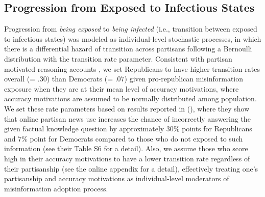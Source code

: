\documentclass[man, 12pt, a4paper, nolmodern, noextraspace]{apa6}
\begin{document}
\subsection{Progression from Exposed to Infectious States}
    Progression from \emph{being exposed} to \emph{being infected} (i.e., transition between exposed to infectious states) was modeled as individual-level stochastic processes, in which there is a differential hazard of transition across partisans following a Bernoulli distribution with the transition rate parameter. Consistent with partisan motivated reasoning accounts \parencite{taber2006, nyhan2010corrections}, we set Republicans to have higher transition rates overall (= .30) than Democrats (= .07) given pro-republican misinformation exposure when they are at their mean level of accuracy motivations, where accuracy motivations are assumed to be normally distributed among population. We set these rate parameters based on results reported in \citeauthor{garrett2016driving} (\citeyear{garrett2016driving}), where they show that online partisan news use increases the chance of incorrectly answering the given factual knowledge question by approximately 30\% points for Republicans and 7\% point for Democrats compared to those who do not exposed to such information (see their Table S6 for a detail). Also, we assume those who score high in their accuracy motivations to have a lower transition rate regardless of their partisanship (see the online appendix for a detail), effectively treating one's partisanship and accuracy motivations as individual-level moderators of misinformation adoption process. 
\end{document}
